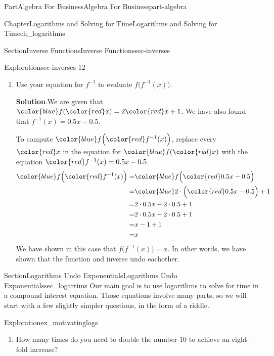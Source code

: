 \documentclass[oneside,10pt,]{tufte-book}
\newcommand{\blocktitlefont}{\relax}
\numberwithin{equation}{chapter}
\newcommand{\amp}{&}
\begin{document}
\begin{partptx}{Part}{Algebra For Business}{}{Algebra For Business}{}{}{part-algebra}
\begin{chapterptx}{Chapter}{Logarithms and Solving for Time}{}{Logarithms and Solving for Time}{}{}{ch_logarithms}
\begin{sectionptx}{Section}{Inverse Functions}{}{Inverse Functions}{}{}{sec-inverses}
\begin{exploration}{Exploration}{}{sec-inverses-12}
\begin{enumerate}[font=\bfseries,label=(\alph*),ref=\alph*]
The equation for our inverse is%
\begin{equation*}
f^{-1}(x) = 0.5 x -0.5
\end{equation*}
%
\item{}Use your equation for \(f^{-1}\) to evaluate \(f\Big(f^{-1}(x)\Big)\).%
\par\smallskip%
\noindent\textbf{\blocktitlefont Solution}.\hypertarget{sec-inverses-12-3-2}{}\quad{}We are given that \(\color{blue} f({\color{red} x}) = 2{\color{red} x} + 1\).  We have also found that \(f^{-1}(x) = 0.5x - 0.5\).%
\par
To compute \({ \color{blue} f\Big({\color{red} f^{-1}(x)}\Big) }\), replace every \(\color{red} x\) in the equation for \(\color{blue} f({\color{red} x}) \) with the equation \(\color{red} f^{-1}(x) = 0.5x - 0.5\).%
\begin{align*}
{ \color{blue} f\Big({\color{red} f^{-1}(x)}\Big) }= \amp {\color{blue} f\Big( { \color{red} 0.5x - 0.5}\Big)}\\
= \amp {\color{blue}  2\cdot \Big({ \color{red} 0.5x - 0.5}\Big) + 1}\\
= \amp 2\cdot 0.5x - 2\cdot 0.5 + 1\\
= \amp 2\cdot 0.5x - 2\cdot 0.5 + 1\\
= \amp x - 1 + 1\\
= \amp x
\end{align*}
We have shown in this case that \(f\Big(f^{-1}(x)\Big)=x\). In other words, we have shown that the function and inverse undo eachother.%
\end{enumerate}%
\end{exploration}%
\end{sectionptx}
%
%
\typeout{************************************************}
\typeout{************************************************}
%
\begin{sectionptx}{Section}{Logarithms Undo Exponentials}{}{Logarithms Undo Exponentials}{}{}{sec_logartims}
Our main goal is to use logarithms to solve for time in a compound interest equation. Those equations involve many parts, so we will start with a few slightly simpler questions, in the form of a riddle.%
\begin{exploration}{Exploration}{}{ex_motivatinglogs}%
\begin{enumerate}[font=\bfseries,label=(\alph*),ref=\alph*]%
\item{}How many times do you need to double the number \(10\) to achieve an eight-fold increase?%
\par\smallskip%

\end{enumerate}
\end{exploration}
\end{sectionptx}
\end{chapterptx}
\end{partptx}
\end{document}
